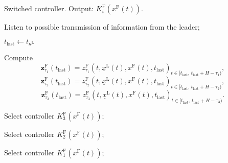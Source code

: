 \begin{algorithm}
	\caption{Switched controller. Output:  $K^{\mathrm{F}}_i(x^{\mathrm{F}}(t))$. }\label{alg:switched_controller}
	\begin{algorithmic}[1]
		\Loop
		
		\State Listen to possible transmission of information from the leader;
		
		
		\State $t_{\mathrm{last}} \leftarrow t_{\kappa^\mathrm{L}}$
		
		\State Compute
		\begin{equation}\label{eq:reference_z_F_tau_1}
			\mathbf{z}_{\tau_1}^\mathrm{F}(t_{\mathrm{last}})={z_{\tau_1}^\mathrm{F}(t,\underline{x}^\mathrm{L}(t),x^\mathrm{F}(t),t_{\mathrm{last}})}_{t\in [t_{\mathrm{last}}, \, t_{\mathrm{last}}+H-\tau_1 )},
		\end{equation}
		\begin{equation}\label{eq:reference_z_F_tau_2}
			\mathbf{z}_{\tau_2}^\mathrm{F}(t_{\mathrm{last}})={z_{\tau_2}^\mathrm{F}(t,\underline{x}^\mathrm{L}(t),x^\mathrm{F}(t),t_{\mathrm{last}})}_{t\in [t_{\mathrm{last}}, \, t_{\mathrm{last}}+H-\tau_2 )},
		\end{equation}
		\begin{equation}\label{eq:reference_z_F_tau_3}
			\mathbf{z}_{\tau_3}^\mathrm{F}(t_{\mathrm{last}})={z_{\tau_3}^\mathrm{F}(t,\underline{x}^\mathrm{L}(t),x^\mathrm{F}(t),t_{\mathrm{last}})}_{t\in [t_{\mathrm{last}}, \, t_{\mathrm{last}}+H-\tau_3 )}.
		\end{equation}
		
		
		
		\State Select controller $K^{\mathrm{F}}_3(x^{\mathrm{F}}(t))$;
		
		
		
		
		
		
		\State Select controller $K^{\mathrm{F}}_2(x^{\mathrm{F}}(t))$;
		
		\Else
		
		\State Select controller $K^{\mathrm{F}}_1(x^{\mathrm{F}}(t))$;
		
		\EndIf
		
		\EndIf
		
		
		
		
		
		\EndLoop
		
	\end{algorithmic}
\end{algorithm}





